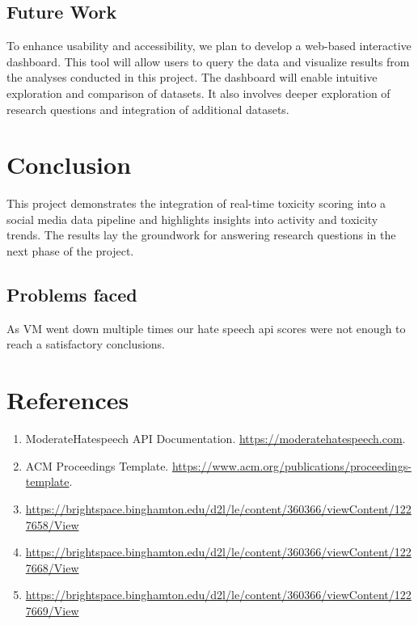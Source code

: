 \documentclass[sigconf]{acmart}
\begin{document}
\subsection{Future Work}
To enhance usability and accessibility, we plan to develop a web-based interactive dashboard. This tool will allow users to query the data and visualize results from the analyses conducted in this project. The dashboard will enable intuitive exploration and comparison of datasets. It also involves deeper exploration of research questions and integration of additional datasets.



\section{Conclusion}
This project demonstrates the integration of real-time toxicity scoring into a social media data pipeline and highlights insights into activity and toxicity trends. The results lay the groundwork for answering research questions in the next phase of the project.

\subsection{Problems faced}
As VM went down multiple times our hate speech api scores were not enough to reach a satisfactory conclusions.

\section{References}
\begin{enumerate}
    \item ModerateHatespeech API Documentation. \url{https://moderatehatespeech.com}.
    \item ACM Proceedings Template. \url{https://www.acm.org/publications/proceedings-template}.
    \item 
    \url{https://brightspace.binghamton.edu/d2l/le/content/360366/viewContent/1227658/View}
    \item 
    \url{https://brightspace.binghamton.edu/d2l/le/content/360366/viewContent/1227668/View}
    \item
    \url{https://brightspace.binghamton.edu/d2l/le/content/360366/viewContent/1227669/View}
\end{enumerate}
\end{document}
